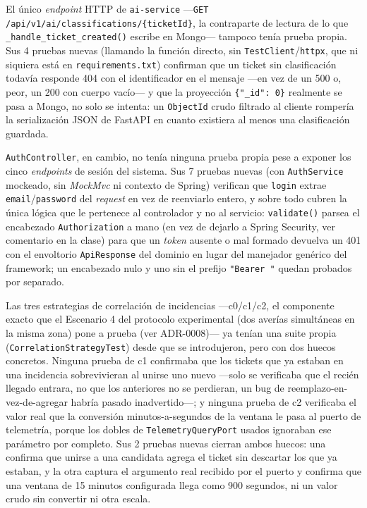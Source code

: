 El único \emph{endpoint} HTTP de \texttt{ai-service} —\texttt{GET
/api/v1/ai/classifications/\{ticketId\}}, la contraparte de lectura de lo que
\texttt{\_handle\_ticket\_created()} escribe en Mongo— tampoco tenía prueba propia. Sus 4 pruebas
nuevas (llamando la función directo, sin \texttt{TestClient}/\texttt{httpx}, que ni siquiera está
en \texttt{requirements.txt}) confirman que un ticket sin clasificación todavía responde 404 con
el identificador en el mensaje —en vez de un 500 o, peor, un 200 con cuerpo vacío— y que la
proyección \texttt{\{"\_id": 0\}} realmente se pasa a Mongo, no solo se intenta: un
\texttt{ObjectId} crudo filtrado al cliente rompería la serialización JSON de FastAPI en cuanto
existiera al menos una clasificación guardada.

\texttt{AuthController}, en cambio, no tenía ninguna prueba propia pese a exponer los cinco
\emph{endpoints} de sesión del sistema. Sus 7 pruebas nuevas (con \texttt{AuthService}
mockeado, sin \emph{MockMvc} ni contexto de Spring) verifican que \texttt{login} extrae
\texttt{email}/\texttt{password} del \emph{request} en vez de reenviarlo entero, y sobre todo
cubren la única lógica que le pertenece al controlador y no al servicio: \texttt{validate()}
parsea el encabezado \texttt{Authorization} a mano (en vez de dejarlo a Spring Security, ver
comentario en la clase) para que un \emph{token} ausente o mal formado devuelva un 401 con el
envoltorio \texttt{ApiResponse} del dominio en lugar del manejador genérico del framework; un
encabezado nulo y uno sin el prefijo \texttt{"Bearer "} quedan probados por separado.

Las tres estrategias de correlación de incidencias —c0/c1/c2, el componente exacto que el
Escenario 4 del protocolo experimental (dos averías simultáneas en la misma zona) pone a prueba
(ver ADR-0008)— ya tenían una suite propia (\texttt{CorrelationStrategyTest}) desde que se
introdujeron, pero con dos huecos concretos. Ninguna prueba de c1 confirmaba que los tickets que
ya estaban en una incidencia sobrevivieran al unirse uno nuevo —solo se verificaba que el
recién llegado entrara, no que los anteriores no se perdieran, un bug de reemplazo-en-vez-de-agregar
habría pasado inadvertido—; y ninguna prueba de c2 verificaba el valor real que la conversión
minutos-a-segundos de la ventana le pasa al puerto de telemetría, porque los dobles de
\texttt{TelemetryQueryPort} usados ignoraban ese parámetro por completo. Sus 2 pruebas nuevas
cierran ambos huecos: una confirma que unirse a una candidata agrega el ticket sin descartar los
que ya estaban, y la otra captura el argumento real recibido por el puerto y confirma que una
ventana de 15 minutos configurada llega como 900 segundos, ni un valor crudo sin convertir ni
otra escala.

